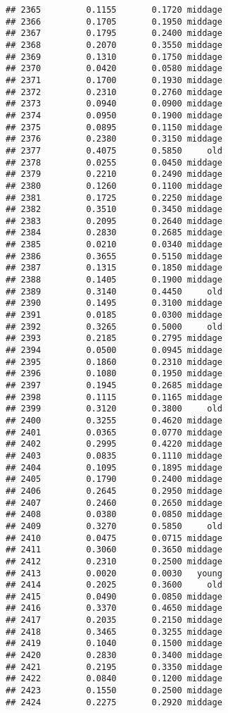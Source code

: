 \documentclass[
]{article}
\begin{document}
\begin{verbatim}
## 2365         0.1155       0.1720 middage
## 2366         0.1705       0.1950 middage
## 2367         0.1795       0.2400 middage
## 2368         0.2070       0.3550 middage
## 2369         0.1310       0.1750 middage
## 2370         0.0420       0.0580 middage
## 2371         0.1700       0.1930 middage
## 2372         0.2310       0.2760 middage
## 2373         0.0940       0.0900 middage
## 2374         0.0950       0.1900 middage
## 2375         0.0895       0.1150 middage
## 2376         0.2380       0.3150 middage
## 2377         0.4075       0.5850     old
## 2378         0.0255       0.0450 middage
## 2379         0.2210       0.2490 middage
## 2380         0.1260       0.1100 middage
## 2381         0.1725       0.2250 middage
## 2382         0.3510       0.3450 middage
## 2383         0.2095       0.2640 middage
## 2384         0.2830       0.2685 middage
## 2385         0.0210       0.0340 middage
## 2386         0.3655       0.5150 middage
## 2387         0.1315       0.1850 middage
## 2388         0.1405       0.1900 middage
## 2389         0.3140       0.4450     old
## 2390         0.1495       0.3100 middage
## 2391         0.0185       0.0300 middage
## 2392         0.3265       0.5000     old
## 2393         0.2185       0.2795 middage
## 2394         0.0500       0.0945 middage
## 2395         0.1860       0.2310 middage
## 2396         0.1080       0.1950 middage
## 2397         0.1945       0.2685 middage
## 2398         0.1115       0.1165 middage
## 2399         0.3120       0.3800     old
## 2400         0.3255       0.4620 middage
## 2401         0.0365       0.0770 middage
## 2402         0.2995       0.4220 middage
## 2403         0.0835       0.1110 middage
## 2404         0.1095       0.1895 middage
## 2405         0.1790       0.2400 middage
## 2406         0.2645       0.2950 middage
## 2407         0.2460       0.2650 middage
## 2408         0.0380       0.0850 middage
## 2409         0.3270       0.5850     old
## 2410         0.0475       0.0715 middage
## 2411         0.3060       0.3650 middage
## 2412         0.2310       0.2500 middage
## 2413         0.0020       0.0030   young
## 2414         0.2025       0.3600     old
## 2415         0.0490       0.0850 middage
## 2416         0.3370       0.4650 middage
## 2417         0.2035       0.2150 middage
## 2418         0.3465       0.3255 middage
## 2419         0.1040       0.1500 middage
## 2420         0.2830       0.3400 middage
## 2421         0.2195       0.3350 middage
## 2422         0.0840       0.1200 middage
## 2423         0.1550       0.2500 middage
## 2424         0.2275       0.2920 middage

\end{verbatim}
\end{document}
